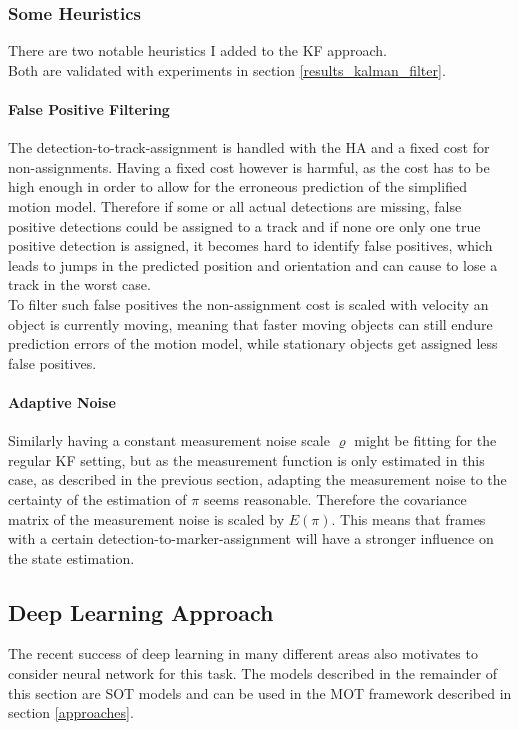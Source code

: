 \documentclass[12pt,a4paper]{article}
\begin{document}
\subsubsection{Some Heuristics}
\label{heuristics}
There are two notable heuristics I added to the KF approach.\\ Both are validated with experiments in section \ref{results_kalman_filter}.

\paragraph{False Positive Filtering} The detection-to-track-assignment is handled with the HA and a fixed cost for non-assignments. Having a fixed cost however is harmful, as the cost has to be high enough in order to allow for the erroneous prediction of the simplified motion model. Therefore if some or all actual detections are missing, false positive detections could be assigned to a track and if none ore only one true positive detection is assigned, it becomes hard to identify false positives, which leads to jumps in the predicted position and orientation and can cause to lose a track in the worst case. \\
To filter such false positives the non-assignment cost is scaled with velocity an object is currently moving, meaning that faster moving objects can still endure prediction errors of the motion model, while stationary objects get assigned less false positives.

\paragraph{Adaptive Noise} Similarly having a constant measurement noise scale $\varrho$
might be fitting for the regular KF setting, but as the measurement function is only estimated in this case, as described in the previous section, adapting the measurement noise to the certainty of the estimation of $\pi$ seems reasonable. Therefore the covariance matrix of the measurement noise is scaled by $E(\pi)$. This means that frames with a certain detection-to-marker-assignment will have a stronger influence on the state estimation.


\subsection{Deep Learning Approach}
\label{dl_approach}

The recent success of deep learning in many different areas also motivates to consider neural network for this task. The models described in the remainder of this section are SOT models and can be used in the MOT framework described in section \ref{approaches}.
\end{document}
